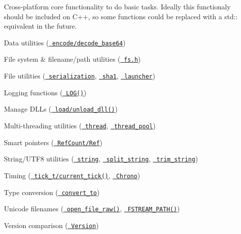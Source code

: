 Cross-\/platform core functionality to do basic tasks. Ideally this functionaly should be included on C++, so some functions could be replaced with a {\ttfamily std\+:\+:} equivalent in the future.


\begin{DoxyItemize}
\item Data utilities (\href{https://github.com/aseprite/laf/blob/main/base/base64.h}{\texttt{ encode/decode\+\_\+base64}})
\item File system \& filename/path utilities (\href{https://github.com/aseprite/laf/blob/main/base/fs.h}{\texttt{ fs.\+h}})
\item File utilities (\href{https://github.com/aseprite/laf/blob/main/base/serialization.h}{\texttt{ serialization}}, \href{https://github.com/aseprite/laf/blob/main/base/sha1.h}{\texttt{ sha1}}, \href{https://github.com/aseprite/laf/blob/main/base/launcher.h}{\texttt{ launcher}})
\item Logging functions (\href{https://github.com/aseprite/laf/blob/main/base/log.h}{\texttt{ LOG()}})
\item Manage DLLs (\href{https://github.com/aseprite/laf/blob/main/base/dll.h}{\texttt{ load/unload\+\_\+dll()}})
\item Multi-\/threading utilities (\href{https://github.com/aseprite/laf/blob/main/base/thread.h}{\texttt{ thread}}, \href{https://github.com/aseprite/laf/blob/main/base/thread_pool.h}{\texttt{ thread\+\_\+pool}})
\item Smart pointers (\href{https://github.com/aseprite/laf/blob/main/base/ref.h}{\texttt{ Ref\+Count/\+Ref}})
\item String/\+UTF8 utilities (\href{https://github.com/aseprite/laf/blob/main/base/string.h}{\texttt{ string}}, \href{https://github.com/aseprite/laf/blob/main/base/split_string.h}{\texttt{ split\+\_\+string}}, \href{https://github.com/aseprite/laf/blob/main/base/trim_string.h}{\texttt{ trim\+\_\+string}})
\item Timing (\href{https://github.com/aseprite/laf/blob/main/base/time.h}{\texttt{ tick\+\_\+t/current\+\_\+tick()}}, \href{https://github.com/aseprite/laf/blob/main/base/chrono.h}{\texttt{ Chrono}})
\item Type conversion (\href{https://github.com/aseprite/laf/blob/main/base/convert_to.h}{\texttt{ convert\+\_\+to}})
\item Unicode filenames (\href{https://github.com/aseprite/laf/blob/main/base/file_handle.h}{\texttt{ open\+\_\+file\+\_\+raw()}}, \href{https://github.com/aseprite/laf/blob/main/base/fstream_path.h}{\texttt{ FSTREAM\+\_\+\+PATH()}})
\item Version comparison (\href{https://github.com/aseprite/laf/blob/main/base/version.h}{\texttt{ Version}}) 
\end{DoxyItemize}